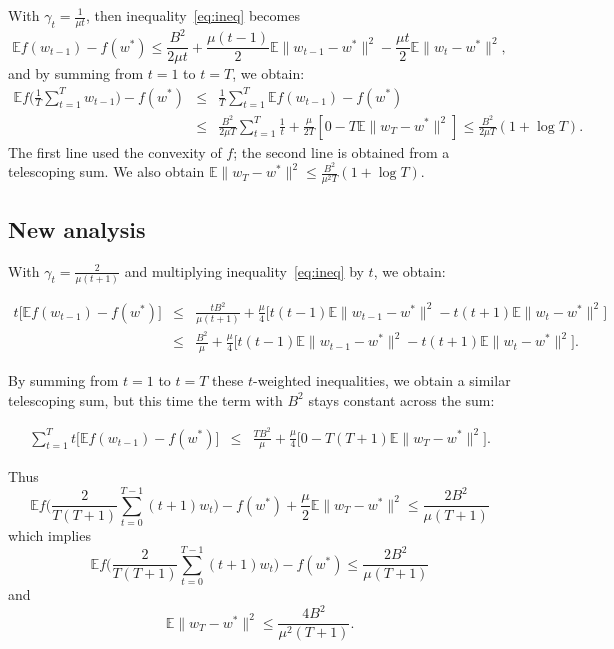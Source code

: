 \documentclass[11pt]{article}
\newcommand{\BEAS}{\begin{eqnarray*}}
\newcommand{\EEAS}{\end{eqnarray*}}
\newcommand{\BEA}{\begin{eqnarray}}
\newcommand{\EEA}{\end{eqnarray}}
\def \E { \mathbb{E} }
\begin{document}
 With $\displaystyle \gamma_t = \frac{1}{\mu t}$, then inequality~\eqref{eq:ineq} becomes 
 $$
  \E f(w_{t-1}) - f(w^\ast)   
  \leqslant    \frac{  B^2}{2 \mu t} + \frac{\mu(t-1) }{2} \E \| w_{t-1}- w^\ast \|^2
 - \frac{ \mu t   }{2} \E \| w_t - w^\ast \|^2,
 $$
 and by summing from $t=1$ to $t=T$, we obtain:
 \BEAS
 \E f \bigg(
  \frac{1}{T} \sum_{t=1}^T w_{t-1}
 \bigg) - f(w^\ast) & \leqslant & 
 \frac{1}{T} \sum_{t=1}^T 
  \E f(w_{t-1}) - f(w^\ast)   \\
  &
  \leqslant &  \frac{B^2}{2 \mu T } \sum_{t=1}^T \frac{1}{t} + \frac{\mu}{2T} \left[0 -  
   T \E \| w_T- w^\ast \|^2 \right] \leqslant \frac{B^2}{2 \mu T } ( 1 + \log T).
 \EEAS
The first line used the convexity of $f$; the second line is obtained from a telescoping sum. We also obtain $\displaystyle \E \| w_T- w^\ast \|^2 \leqslant \frac{B^2}{\mu^2 T } ( 1 + \log T)$.

 \subsection{New analysis} \label{sec:new_analysis}

 With $\displaystyle \gamma_t = \frac{2}{\mu(t+1)}$ and multiplying inequality~\eqref{eq:ineq} by $t$, we obtain:
 
 \BEAS
 t \big[ \E f(w_{t-1}) - f(w^\ast)   \big]
 & \leqslant &  \frac{t B^2}{
\mu(t+1)} + 
\frac{\mu}{4} \bigg[ t (t-1)
  \E \| w_{t-1}- w^\ast \|^2
 - t(t+1) \E \| w_t - w^\ast \|^2
 \bigg]
\\
 & \leqslant &  \frac{  B^2}{
\mu } + 
\frac{\mu}{4} \bigg[ t (t-1)
  \E \| w_{t-1}- w^\ast \|^2
 - t(t+1) \E \| w_t - w^\ast \|^2
 \bigg].
 \EEAS
 
 By summing from $t = 1$ to $t=T$ these $t$-weighted inequalities, we obtain a similar telescoping sum, but this time the term with $B^2$ stays constant across the sum:
 
 \BEA
\sum_{t=1}^T  t \big[ \E f(w_{t-1}) - f(w^\ast)   \big]
   & \leqslant &  \frac{  T B^2}{
\mu } + 
\frac{\mu}{4} \bigg[ 0 
 - T(T+1) \E \| w_T - w^\ast \|^2
 \bigg]. \label{eq:telescope}
 \EEA
 
 Thus
 $$
 \E f \bigg( \frac{2}{T(T+1)} \sum_{t=0}^{T-1} (t+1) w_t \bigg) - f(w^\ast) 
 + \frac{\mu }{2} \E \| w_T - w^\ast \|^2
 \leqslant \frac{  2 B^2}{ \mu( T + 1 )}
 $$
 which implies 
 $$ \E f \bigg( \frac{2}{T(T+1)} \sum_{t=0}^{T-1} (t+1) w_t \bigg)   - f(w^\ast)  
 \leqslant
 \frac{  2 B^2}{ \mu( T + 1 )}$$
 and 
 $$
 \E \| w_T - w^\ast \|^2 \leqslant \frac{  4 B^2}{ \mu^2( T + 1 )}.
 $$
 
\end{document}
